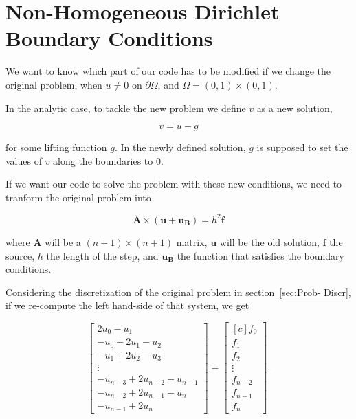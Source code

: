 \documentclass[fontsize=11pt,paper=a4,titlepage]{article}
\begin{document}
\section{Non-Homogeneous Dirichlet Boundary Conditions}

We want to know which part of our code has to be modified if we change the
original problem, when $u \neq 0$ on $\partial\Omega$, and $\Omega = (0,1)
\times (0,1)$.

In the analytic case, to tackle the new problem we define $v$ as a new solution,

\begin{equation}
	v = u - g
\end{equation}

for some lifting function $g$. In the newly defined solution, $g$ is supposed to
set the values of $v$ along the boundaries to $0$.

If we want our code to solve the problem with these new conditions, we need to
tranform the original problem into

\begin{displaymath}
	\mathbf{A} \times (\mathbf{u} + \mathbf{u_B}) = h^2 \mathbf{f}
\end{displaymath}

where $\mathbf{A}$ will be a $(n + 1) \times (n + 1)$ matrix, $\mathbf{u}$ will
be the old solution, $\mathbf{f}$ the source, $h$ the length of the step, and
$\mathbf{u_B}$ the function that satisfies the boundary conditions.

Considering the discretization of the original problem in section~\ref{sec:Prob-
Discr}, if we re-compute the left hand-side of that system, we get

\begin{displaymath}
\begin{bmatrix}
	2u_0 - u_1 \\
	- u_0 + 2u_1 - u_2 \\
	- u_1 + 2u_2 - u_3 \\
	\vdots \\
	- u_{n - 3} + 2u_{n - 2} - u_{n - 1} \\
	- u_{n - 2} + 2u_{n - 1} - u_{n} \\
	- u_{n - 1} + 2u_n
\end{bmatrix}
=
\begin{bmatrix*}[c]
	f_0 \\
	f_1 \\
	f_2 \\
	\vdots \\
	f_{n - 2} \\
	f_{n - 1} \\
	f_n
\end{bmatrix*}.
\end{displaymath}
\end{document}
